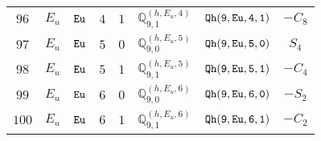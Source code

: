 \documentclass[fleqn,8pt]{jsarticle}
\begin{document}
\begin{table}[ht!]
\begin{center}
\begin{tabular}{cccccccc}
$ 96 $ & $ E_{u} $ & $ {\tt Eu} $ & $ 4 $ & $ 1 $ & $ \mathbb{Q}_{9,1}^{(h,E_{u},4)} $ & $ {\tt Qh(9,Eu,4,1)} $ & $ - C_{8} $ \\
$ 97 $ & $ E_{u} $ & $ {\tt Eu} $ & $ 5 $ & $ 0 $ & $ \mathbb{Q}_{9,0}^{(h,E_{u},5)} $ & $ {\tt Qh(9,Eu,5,0)} $ & $ S_{4} $ \\
$ 98 $ & $ E_{u} $ & $ {\tt Eu} $ & $ 5 $ & $ 1 $ & $ \mathbb{Q}_{9,1}^{(h,E_{u},5)} $ & $ {\tt Qh(9,Eu,5,1)} $ & $ - C_{4} $ \\
$ 99 $ & $ E_{u} $ & $ {\tt Eu} $ & $ 6 $ & $ 0 $ & $ \mathbb{Q}_{9,0}^{(h,E_{u},6)} $ & $ {\tt Qh(9,Eu,6,0)} $ & $ - S_{2} $ \\
$ 100 $ & $ E_{u} $ & $ {\tt Eu} $ & $ 6 $ & $ 1 $ & $ \mathbb{Q}_{9,1}^{(h,E_{u},6)} $ & $ {\tt Qh(9,Eu,6,1)} $ & $ - C_{2} $ \\
 \hline \hline
\end{tabular}
\end{center}
\end{table}
\end{document}
